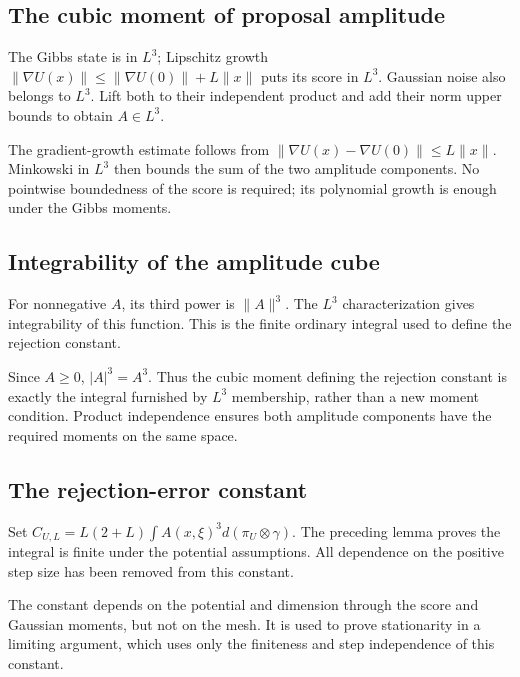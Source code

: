 \documentclass[11pt,a4paper]{article}
\begin{document}
\subsection{\texorpdfstring{The cubic moment of proposal amplitude}{The cubic moment of proposal amplitude}}


The Gibbs state is in \(L^3\); Lipschitz growth \(\|\nabla U(x)\|\le\|\nabla U(0)\|+L\|x\|\) puts its score in \(L^3\). Gaussian noise also belongs to \(L^3\). Lift both to their independent product and add their norm upper bounds to obtain \(A\in L^3\).



The gradient-growth estimate follows from \(\|\nabla U(x)-\nabla U(0)\|\le L\|x\|\). Minkowski in \(L^3\) then bounds the sum of the two amplitude components. No pointwise boundedness of the score is required; its polynomial growth is enough under the Gibbs moments.


\subsection{\texorpdfstring{Integrability of the amplitude cube}{Integrability of the amplitude cube}}


For nonnegative \(A\), its third power is \(\|A\|^3\). The \(L^3\) characterization gives integrability of this function. This is the finite ordinary integral used to define the rejection constant.



Since \(A\ge0\), \(|A|^3=A^3\). Thus the cubic moment defining the rejection constant is exactly the integral furnished by \(L^3\) membership, rather than a new moment condition. Product independence ensures both amplitude components have the required moments on the same space.


\subsection{\texorpdfstring{The rejection-error constant}{The rejection-error constant}}


Set \(C_{U,L}=L(2+L)\int A(x,\xi)^3d(\pi_U\otimes\gamma)\). The preceding lemma proves the integral is finite under the potential assumptions. All dependence on the positive step size has been removed from this constant.



The constant depends on the potential and dimension through the score and Gaussian moments, but not on the mesh. It is used to prove stationarity in a limiting argument, which uses only the finiteness and step independence of this constant.
\end{document}
